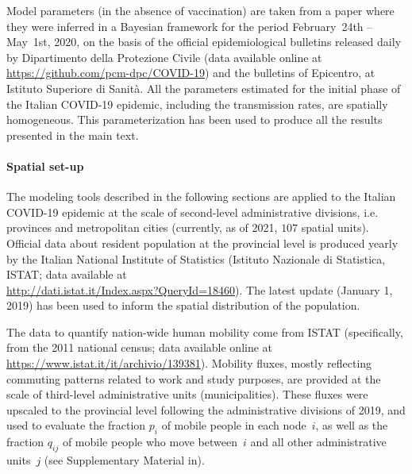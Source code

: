 Model parameters (in the absence of vaccination) are taken from a paper\cite{Bertuzzo:GeographyCOVID19Spread:2020} where they were inferred in a Bayesian framework for the period February~24th -- May~1st, 2020, on the basis of the official epidemiological bulletins released daily by Dipartimento della Protezione Civile\cite{DipartimentodellaProtezioneCivile:EmergenzaCoronavirusRisposta} (data available online at {\url{https://github.com/pcm-dpc/COVID-19}}) and the bulletins of Epicentro, at Istituto Superiore di Sanit{à}\cite{IstitutoSuperiorediSanita:CoronavirusUltimiAggiornamenti:2020,Palmieri:CharacteristicsCOVID19Patients:2020}. All the parameters estimated for the initial phase of the Italian COVID-19 epidemic, including the transmission rates, are spatially homogeneous\cite{Bertuzzo:GeographyCOVID19Spread:2020}. This parameterization has been used to produce all the results presented in the main text.


\paragraph{Spatial set-up} 
The modeling tools described in the following sections are applied to the Italian COVID-19 epidemic at the scale of second-level administrative divisions, i.e. provinces and metropolitan cities (currently, as of 2021, $107$ spatial units). Official data about resident population at the provincial level is produced yearly by the Italian National Institute of Statistics (Istituto Nazionale di Statistica, ISTAT; data available at\\ \url{http://dati.istat.it/Index.aspx?QueryId=18460}). The latest update (January 1, 2019) has been used to inform the spatial distribution of the population. %

The data to quantify nation-wide human mobility come from ISTAT (specifically, from the 2011 national census; data available online at \url{https://www.istat.it/it/archivio/139381}). Mobility fluxes, mostly reflecting commuting patterns related to work and study purposes, are provided at the scale of third-level administrative units (municipalities)\cite{Pepe:COVID19OutbreakResponse:2020,Vollmer:Report20Using:2020}. These fluxes were upscaled to the provincial level following the administrative divisions of 2019, and used to evaluate the fraction $p_i$ of mobile people in each node~$i$, as well as the fraction $q_{ij}$ of mobile people who move between~$i$ and all other administrative units~$j$ (see Supplementary Material in\cite{Gatto:SpreadDynamicsCOVID19:2020}).

